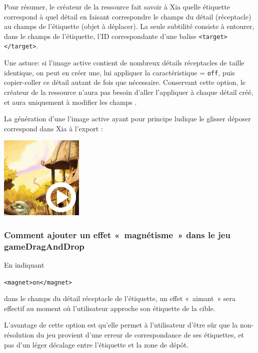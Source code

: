 {Pour résumer, le créateur de la ressource fait savoir à Xia quelle étiquette correspond à quel détail en faisant 
correspondre le champs  du détail (réceptacle) au champs  de l'étiquette 
(objet à déplacer). La seule subtilité consiste à entourer, dans le champs 
de l'étiquette, l'ID correspondante d'une balise \verb|<target></target>|.

Une astuce: si l'image active contient de nombreux détails réceptacles de taille identique, 
on peut en créer une, lui appliquer la caractéristique  = \verb|off|, 
puis copier-coller ce détail autant de fois que nécessaire. Conservant cette option, 
le créateur de la ressource n'aura pas besoin d'aller l'appliquer à chaque détail créé, 
et aura uniquement à modifier les champs .

La génération d'une l'image active ayant pour principe ludique le glisser déposer 
correspond dans Xia à l'export :

\begin{center}
\includegraphics[scale=0.7]{./images/gameDragAndDrop} 
\end{center}

\subsubsection{Comment ajouter un effet «~magnétisme~» dans le jeu gameDragAndDrop}

En indiquant\\
\begin{center}
\verb|<magnet>on</magnet>| 
\end{center}
dans le champs 
du détail réceptacle de l'étiquette, un effet «~aimant~» sera effectif au moment où 
l'utilisateur approche son étiquette de la cible.

L'avantage de cette option est qu'elle permet à l'utilisateur d'être sûr que 
la non-résolution du jeu provient d'une erreur de correspondance de ses 
étiquettes, et pas d'un léger décalage entre l'étiquette et la zone de dépôt.

}
